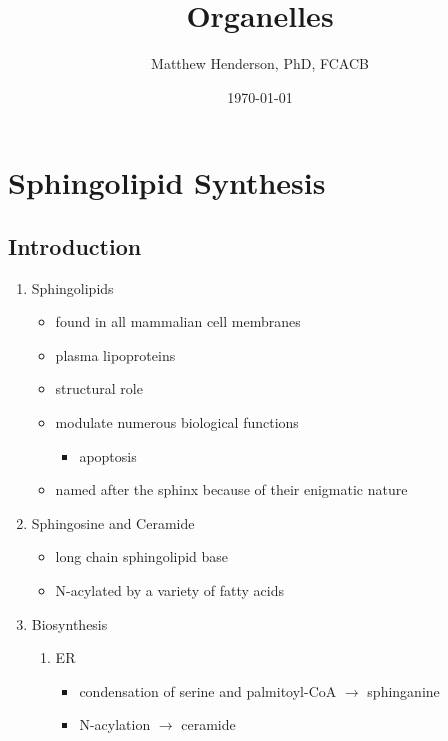 \documentclass{scrartcl}
\author{Matthew Henderson, PhD, FCACB}
\date{\today}
\title{Organelles}
\begin{document}
\maketitle
\tableofcontents


\section{Sphingolipid Synthesis}
\label{sec:org4818ad0}
\subsection{Introduction}
\label{sec:org46dfc7a}
\begin{enumerate}
\item Sphingolipids
\label{sec:org29bc220}
\begin{itemize}
\item found in all mammalian cell membranes
\item plasma lipoproteins
\item structural role
\item modulate numerous biological functions
\begin{itemize}
\item apoptosis
\end{itemize}
\item named after the sphinx because of their enigmatic nature
\end{itemize}

\item Sphingosine and Ceramide
\label{sec:org42c20a7}
\begin{itemize}
\item long chain sphingolipid base
\item N-acylated by a variety of fatty acids
\end{itemize}


\item Biosynthesis
\label{sec:org4fc998e}
\begin{enumerate}
\item ER
\label{sec:orgde899d7}
\begin{itemize}
\item condensation of serine and palmitoyl-CoA \(\to\) sphinganine
\item N-acylation \(\to\) ceramide
\end{itemize}


\end{enumerate}
\end{enumerate}
\end{document}
